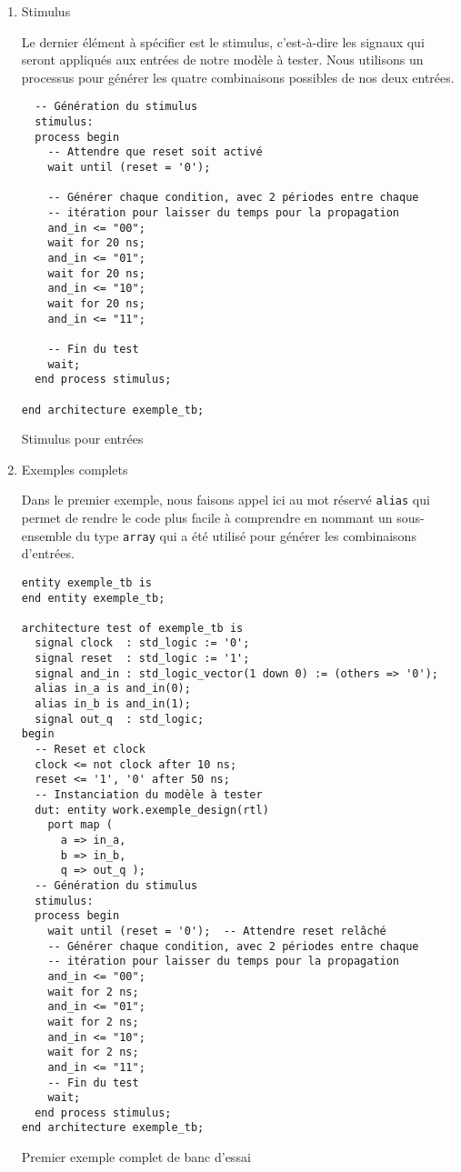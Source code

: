 \documentclass[letter, oneside]{book}
\begin{document}
\begin{enumerate}
\item Stimulus
\label{sec:orgf957401}

Le dernier élément à spécifier est le stimulus, c'est-à-dire les
signaux qui seront appliqués aux entrées de notre modèle à
tester. Nous utilisons un processus pour générer les quatre
combinaisons possibles de nos deux entrées.

\begin{listing}[htbp]
\begin{verbatim}
  -- Génération du stimulus
  stimulus:
  process begin
    -- Attendre que reset soit activé
    wait until (reset = '0');

    -- Générer chaque condition, avec 2 périodes entre chaque
    -- itération pour laisser du temps pour la propagation
    and_in <= "00";
    wait for 20 ns;
    and_in <= "01";
    wait for 20 ns;
    and_in <= "10";
    wait for 20 ns;
    and_in <= "11";

    -- Fin du test
    wait;
  end process stimulus;

end architecture exemple_tb;
\end{verbatim}
\caption{Stimulus pour entrées}
\end{listing}

\item Exemples complets
\label{sec:org9f34812}

Dans le premier exemple, nous faisons appel ici au mot réservé \texttt{alias}
qui permet de rendre le code plus facile à comprendre en nommant un
sous-ensemble du type \texttt{array} qui a été utilisé pour générer les
combinaisons d'entrées.

\begin{listing}[htbp]
\begin{verbatim}
entity exemple_tb is
end entity exemple_tb;

architecture test of exemple_tb is
  signal clock  : std_logic := '0';
  signal reset  : std_logic := '1';
  signal and_in : std_logic_vector(1 down 0) := (others => '0');
  alias in_a is and_in(0);
  alias in_b is and_in(1);
  signal out_q  : std_logic;
begin
  -- Reset et clock
  clock <= not clock after 10 ns;
  reset <= '1', '0' after 50 ns;
  -- Instanciation du modèle à tester 
  dut: entity work.exemple_design(rtl)
    port map (
      a => in_a,
      b => in_b,
      q => out_q );
  -- Génération du stimulus
  stimulus:
  process begin
    wait until (reset = '0');  -- Attendre reset relâché
    -- Générer chaque condition, avec 2 périodes entre chaque
    -- itération pour laisser du temps pour la propagation
    and_in <= "00";
    wait for 2 ns;
    and_in <= "01";
    wait for 2 ns;
    and_in <= "10";
    wait for 2 ns;
    and_in <= "11";
    -- Fin du test
    wait;
  end process stimulus;
end architecture exemple_tb;
\end{verbatim}
\caption{Premier exemple complet de banc d'essai}
\end{listing}


\end{enumerate}
\end{document}
